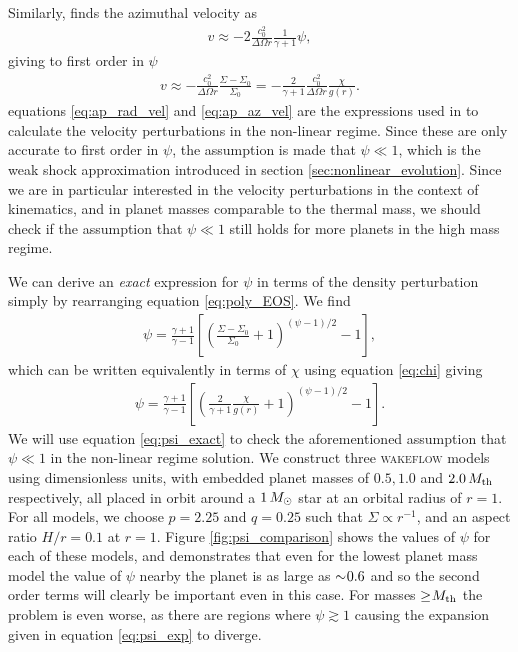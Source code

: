 Similarly, \citet{rafikov2002a} finds the azimuthal velocity as
\begin{align}
    v \approx -2 \frac{c_0^2}{\Delta\Omega r} \frac{1}{\gamma + 1} \psi, \label{eq:v_rafikov}
\end{align}
giving to first order in $\psi$
\begin{align}
    v \approx - \frac{c_0^2}{\Delta \Omega r} \frac{\Sigma - \Sigma_0}{\Sigma_0} = - \frac{2}{\gamma + 1} \frac{c_0^2}{\Delta \Omega r} \frac{\chi}{g(r)}. \label{eq:ap_az_vel}
\end{align}
equations \ref{eq:ap_rad_vel} and \ref{eq:ap_az_vel} are the expressions used in \citet{bollati2021} to calculate the velocity perturbations in the non-linear regime. 
Since these are only accurate to first order in $\psi$, the assumption is made that $\psi \ll 1$, which is the weak shock approximation introduced in section \ref{sec:nonlinear_evolution}.
Since we are in particular interested in the velocity perturbations in the context of kinematics, and in planet masses comparable to the thermal mass, we should check if the assumption that $\psi \ll 1$ still holds for more planets in the high mass regime.

We can derive an \textit{exact} expression for $\psi$ in terms of the density perturbation simply by rearranging equation \ref{eq:poly_EOS}. We find
\begin{align}
    \psi = \frac{\gamma + 1}{\gamma - 1} \left[ \left( \frac{\Sigma-\Sigma_0}{\Sigma_0} +1  \right)^{(\psi-1)/2}  -1 \right],
\end{align}
which can be written equivalently in terms of $\chi$ using equation \ref{eq:chi} giving
\begin{align}
    \psi = \frac{\gamma + 1}{\gamma - 1} \left[ \left( \frac{2}{\gamma + 1} \frac{\chi}{g(r)} +1  \right)^{(\psi-1)/2} -1 \right]. \label{eq:psi_exact}
\end{align}
We will use equation \ref{eq:psi_exact} to check the aforementioned assumption that $\psi \ll 1$ in the non-linear regime solution. 
We construct three \textsc{wakeflow} models using dimensionless units, with embedded planet masses of $0.5, 1.0$ and $2.0 \, M_{\rm{th}}$ respectively, all placed in orbit around a $1 \, M_{\rm{\odot}}$ star at an orbital radius of $r=1$. 
For all models, we choose $p=2.25$ and $q=0.25$ such that $\Sigma \propto r^{-1}$, and an aspect ratio $H/r=0.1$ at $r=1$. 
Figure \ref{fig:psi_comparison} shows the values of $\psi$ for each of these models, and demonstrates that even for the lowest planet mass model the value of $\psi$ nearby the planet is as large as $\sim \hspace{-0.23em} 0.6$ and so the second order terms will clearly be important even in this case. 
For masses $\ge \hspace{-0.23em} M_\mathrm{th}$ the problem is even worse, as there are regions where $\psi \gtrsim 1$ causing the expansion given in equation \ref{eq:psi_exp} to diverge.


